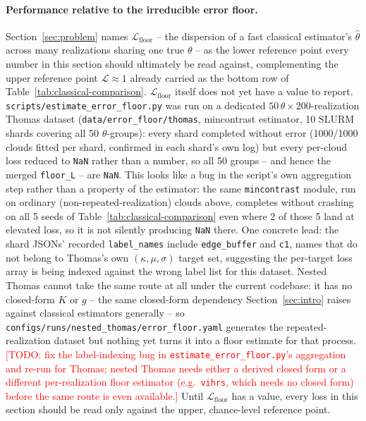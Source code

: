 \documentclass[11pt,letterpaper]{article}
\newcommand{\1}{\mathds{1}}
\newcommand{\todo}[1]{\textcolor{red}{[TODO: #1]}}
\newcommand{\fix}[1]{\textcolor{blue}{[FIX: #1]}}
\newcommand{\todo}[1]{}\newcommand{\fix}[1]{}
\theoremstyle{plain}
\theoremstyle{definitioncolon}
\begin{document}
\paragraph{Performance relative to the irreducible error floor.}
Section~\ref{sec:problem} names $\mathcal{L}_{\text{floor}}$ -- the
dispersion of a fast classical estimator's $\hat\theta$ across many
realizations sharing one true $\theta$ -- as the lower reference point every
number in this section should ultimately be read against, complementing the
upper reference point $\mathcal{L}\approx1$ already carried as the bottom row
of Table~\ref{tab:classical-comparison}. $\mathcal{L}_{\text{floor}}$ itself
does not yet have a value to report.
\texttt{scripts/estimate\_error\_floor.py} was run on a dedicated
$50\,\theta \times 200$-realization Thomas dataset
(\texttt{data/error\_floor/thomas}, mincontrast estimator, 10 SLURM shards
covering all 50 $\theta$-groups): every shard completed without error
(1000/1000 clouds fitted per shard, confirmed in each shard's own log) but
every per-cloud loss reduced to \texttt{NaN} rather than a number, so all 50
groups -- and hence the merged \texttt{floor\_L} -- are \texttt{NaN}. This
looks like a bug in the script's own aggregation step rather than a property
of the estimator: the same \texttt{mincontrast} module, run on ordinary
(non-repeated-realization) clouds above, completes without crashing on all
5 seeds of Table~\ref{tab:classical-comparison} even where 2 of those 5 land
at elevated loss, so it is not silently producing \texttt{NaN} there. One
concrete lead: the shard JSONs' recorded \texttt{label\_names} include
\texttt{edge\_buffer} and \texttt{c1}, names that do not belong to Thomas's
own $(\kappa,\mu,\sigma)$ target set, suggesting the per-target loss array is
being indexed against the wrong label list for this dataset. Nested Thomas
cannot take the same route at all under the current codebase: it has no
closed-form $K$ or $g$ -- the same closed-form dependency
Section~\ref{sec:intro} raises against classical estimators generally -- so
\texttt{configs/runs/nested\_thomas/error\_floor.yaml} generates the
repeated-realization dataset but nothing yet turns it into a floor estimate
for that process. \todo{fix the label-indexing bug in
\texttt{estimate\_error\_floor.py}'s aggregation and re-run for Thomas;
nested Thomas needs either a derived closed form or a different
per-realization floor estimator (e.g.\ \texttt{vihrs}, which needs no
closed form) before the same route is even available.} Until
$\mathcal{L}_{\text{floor}}$ has a value, every loss in this section should
be read only against the upper, chance-level reference point.
\end{document}
